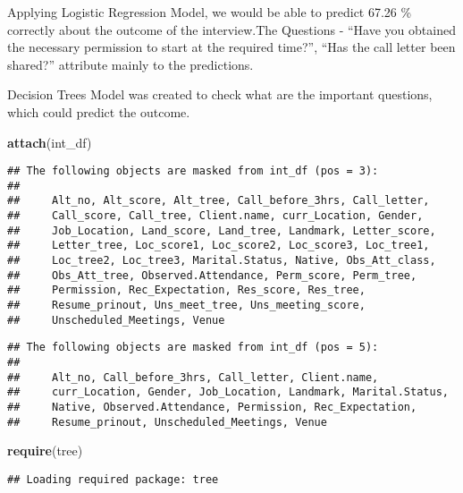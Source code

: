 \documentclass[]{article}
\newenvironment{Shaded}{\begin{snugshade}}{\end{snugshade}}
\newcommand{\KeywordTok}[1]{\textcolor[rgb]{0.13,0.29,0.53}{\textbf{#1}}}
\newcommand{\NormalTok}[1]{#1}
\begin{document}
Applying Logistic Regression Model, we would be able to predict 67.26 \%
correctly about the outcome of the interview.The Questions - ``Have you
obtained the necessary permission to start at the required time?'',
``Has the call letter been shared?'' attribute mainly to the
predictions.

Decision Trees Model was created to check what are the important
questions, which could predict the outcome.

\begin{Shaded}
\begin{Highlighting}[]
\KeywordTok{attach}\NormalTok{(int_df)}
\end{Highlighting}
\end{Shaded}

\begin{verbatim}
## The following objects are masked from int_df (pos = 3):
## 
##     Alt_no, Alt_score, Alt_tree, Call_before_3hrs, Call_letter,
##     Call_score, Call_tree, Client.name, curr_Location, Gender,
##     Job_Location, Land_score, Land_tree, Landmark, Letter_score,
##     Letter_tree, Loc_score1, Loc_score2, Loc_score3, Loc_tree1,
##     Loc_tree2, Loc_tree3, Marital.Status, Native, Obs_Att_class,
##     Obs_Att_tree, Observed.Attendance, Perm_score, Perm_tree,
##     Permission, Rec_Expectation, Res_score, Res_tree,
##     Resume_prinout, Uns_meet_tree, Uns_meeting_score,
##     Unscheduled_Meetings, Venue
\end{verbatim}

\begin{verbatim}
## The following objects are masked from int_df (pos = 5):
## 
##     Alt_no, Call_before_3hrs, Call_letter, Client.name,
##     curr_Location, Gender, Job_Location, Landmark, Marital.Status,
##     Native, Observed.Attendance, Permission, Rec_Expectation,
##     Resume_prinout, Unscheduled_Meetings, Venue
\end{verbatim}

\begin{Shaded}
\begin{Highlighting}[]
\KeywordTok{require}\NormalTok{(tree)}
\end{Highlighting}
\end{Shaded}

\begin{verbatim}
## Loading required package: tree
\end{verbatim}
\end{document}

